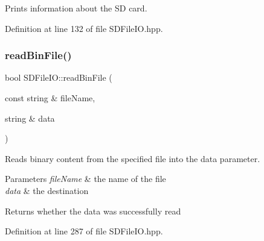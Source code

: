 Prints information about the SD card. 

Definition at line 132 of file S\+D\+File\+I\+O.\+hpp.


\begin{DoxyCode}{0}

\end{DoxyCode}
\mbox{\label{classSDFileIO_a5a06abe7718fa74b84fadad7650bfdad}} 
\subsubsection{\texorpdfstring{readBinFile()}{readBinFile()}}
{\footnotesize\ttfamily bool S\+D\+File\+I\+O\+::read\+Bin\+File (\begin{DoxyParamCaption}\item[{const string \&}]{file\+Name,  }\item[{string \&}]{data }\end{DoxyParamCaption})\hspace{0.3cm}{\ttfamily [inline]}}

Reads binary content from the specified file into the data parameter.


\begin{DoxyParams}{Parameters}
{\em file\+Name} & the name of the file \\
\hline
{\em data} & the destination \\
\hline
\end{DoxyParams}
\begin{DoxyReturn}{Returns}
whether the data was successfully read 
\end{DoxyReturn}


Definition at line 287 of file S\+D\+File\+I\+O.\+hpp.


